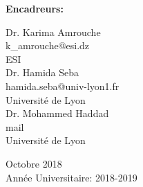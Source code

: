 \begin{titlepage}
\begin{center}
\begin{multicols}{2}
	\end{multicols} 
	
	\vskip 0.13in

	 \textbf{Encadreurs:}\\
	 
	 \begin{multicols}{3}
			\Large 	Dr. Karima Amrouche\\
			\large k\_amrouche@esi.dz\\
			ESI\\
		\columnbreak
 			\Large Dr. Hamida Seba\\
			\large hamida.seba@univ-lyon1.fr\\
			Université de Lyon \\
		\columnbreak
 			\Large Dr. Mohammed Haddad\\
			\large mail\\
			Université de Lyon \\
	\end{multicols}
	
	
	\small
	\vskip 0.5in
	Octobre 2018 \\
	Année Universitaire: 2018-2019\\
	
	\end{center}		
\restoregeometry
\end{titlepage}